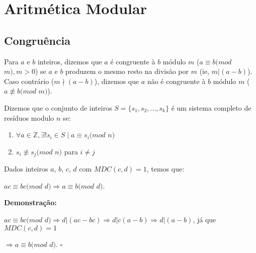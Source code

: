 
\chapter{Aritmética Modular} %

\label{Chapter2} %


\section{Congruência}

\begin{definition}
Para $a$ e $b$ inteiros, dizemos que $a$ é congruente à $b$ módulo $m$ ($a \equiv b (mod$ $m), m > 0$) 
se $a$ e $b$ produzem o mesmo resto na divisão por $m$ (ie, $m|(a-b)$).
Caso contrário ($m\nmid (a-b)$), dizemos que $a$ não é congruente à $b$ módulo $m$ ($a \not\equiv b (mod $ $m)$).
\\
\end{definition}


\begin{definition}
Dizemos que o conjunto de inteiros $S = \{s_1, s_2, ..., s_k\}$ é um sistema completo de resíduos modulo $n$ se:
\begin{enumerate}
\item$\forall a \in \mathbb{Z}, \exists! s_i \in S \mid a \equiv s_i (mod$ $n)$
\item$s_i \not\equiv s_j (mod $ $n)$ para $i \neq j$
\\
\end{enumerate}
\end{definition}


\begin{corollary}\label{corolario_implicacao_mdc}
Dados inteiros $a$, $b$, $c$, $d$ com $MDC(c,d)=1$, temos que: 

$ac \equiv bc (mod$ $d) \Rightarrow a \equiv b (mod$ $d)$.
\end{corollary}
\textbf{Demonstração:}

$ac \equiv bc (mod$ $d) \Rightarrow d|(ac-bc) \Rightarrow d|c(a-b) \Rightarrow d|(a-b)$, já que $MDC(c,d)=1$

$\Rightarrow a \equiv b (mod$ $d)$. $\square$
\\


